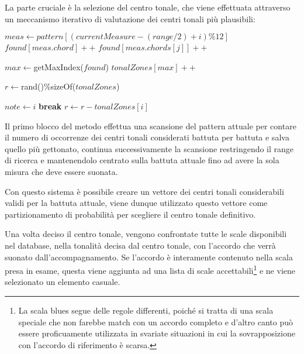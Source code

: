 La parte cruciale è la selezione del centro tonale, che viene effettuata attraverso un meccanismo iterativo di valutazione dei centri tonali più plausibili:

\begin{algorithm}[H]
\caption{}
\label{algo-director-tzone}
\begin{algorithmic}[1]
			\State $meas \gets pattern[(currentMeasure - (range/2) + i) \% 12]$
				\State $found[meas.chord] ++$
			\Else
				 	\State $found[meas.chords[j]] ++$
				\EndFor
			\EndIf
		\EndFor
		
		\State $max \gets $getMaxIndex($found$)
		\State $tonalZones[max] ++$
		
	\EndFor
	
	\State $r \gets $rand()$ \% $sizeOf($tonalZones$)
	
				\State $note \gets i$
				\State \textbf{break}
			\Else
				\State $r \gets r - tonalZones[i]$
			\EndIf
		\EndIf
	\EndFor
\EndFunction
\end{algorithmic}
\end{algorithm}

Il primo blocco del metodo effettua una scansione del pattern attuale per contare il numero di occorrenze dei centri tonali considerati battuta per battuta e salva quello più gettonato, continua successivamente la scansione restringendo il range di ricerca e mantenendolo centrato sulla battuta attuale fino ad avere la sola misura che deve essere suonata.

Con questo sistema è possibile creare un vettore dei centri tonali considerabili validi per la battuta attuale, viene dunque utilizzato questo vettore come partizionamento di probabilità per scegliere il centro tonale definitivo.

Una volta deciso il centro tonale, vengono confrontate tutte le scale disponibili nel database, nella tonalità decisa dal centro tonale, con l'accordo che verrà suonato dall'accompagnamento. Se l'accordo è interamente contenuto nella scala presa in esame, questa viene aggiunta ad una lista di scale accettabili\footnote{La scala blues segue delle regole differenti, poiché si tratta di una scala speciale che non farebbe match con un accordo completo e d'altro canto può essere proficuamente utilizzata in svariate situazioni in cui la sovrapposizione con l'accordo di riferimento è scarsa.} e ne viene selezionato un elemento casuale.

